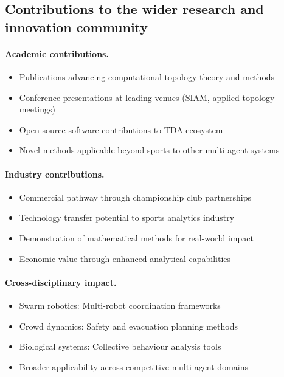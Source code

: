\subsection{Contributions to the wider research and innovation community}

\paragraph{Academic contributions.}
\begin{itemize}
  \item Publications advancing computational topology theory and methods
  \item Conference presentations at leading venues (SIAM, applied topology meetings)
  \item Open-source software contributions to TDA ecosystem
  \item Novel methods applicable beyond sports to other multi-agent systems
\end{itemize}

\paragraph{Industry contributions.}
\begin{itemize}
  \item Commercial pathway through championship club partnerships
  \item Technology transfer potential to sports analytics industry
  \item Demonstration of mathematical methods for real-world impact
  \item Economic value through enhanced analytical capabilities
\end{itemize}

\paragraph{Cross-disciplinary impact.}
\begin{itemize}
  \item Swarm robotics: Multi-robot coordination frameworks
  \item Crowd dynamics: Safety and evacuation planning methods
  \item Biological systems: Collective behaviour analysis tools
  \item Broader applicability across competitive multi-agent domains
\end{itemize}

